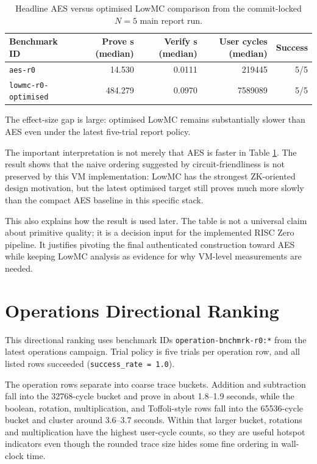 \begin{table}[H]
\centering
\reporttablesetup
\begin{tabular*}{\textwidth}{@{\extracolsep{\fill}}lrrrr@{}}
\hline
Benchmark ID & Prove s (median) & Verify s (median) & User cycles (median) & Success \\
\hline
\texttt{aes-r0} & 14.530 & 0.0111 & 219445 & 5/5 \\
\texttt{lowmc-r0-optimised} & 484.279 & 0.0970 & 7589089 & 5/5 \\
\hline
\end{tabular*}
\caption{Headline AES versus optimised LowMC comparison from the commit-locked
\(N=5\) main report run.}
\label{tab:cross-algo-comparison}
\end{table}

The effect-size gap is large: optimised LowMC remains substantially slower than
AES even under the latest five-trial report policy.

The important interpretation is not merely that AES is faster in Table
\ref{tab:cross-algo-comparison}. The result shows that the naive ordering
suggested by circuit-friendliness is not preserved by this VM implementation:
LowMC has the strongest ZK-oriented design motivation, but the latest optimised
target still proves much more slowly than the compact AES baseline in this
specific stack.

This also explains how the result is used later. The table is not a universal
claim about primitive quality; it is a decision input for the implemented RISC
Zero pipeline. It justifies pivoting the final authenticated construction toward
AES while keeping LowMC analysis as evidence for why VM-level measurements are
needed.

\section{Operations Directional Ranking}

This directional ranking uses benchmark IDs
\texttt{operation-bnchmrk-r0:*} from the latest operations campaign. Trial
policy is five trials per operation row, and all listed rows succeeded
(\texttt{success\_rate = 1.0}).

The operation rows separate into coarse trace buckets. Addition and subtraction
fall into the 32768-cycle bucket and prove in about 1.8--1.9 seconds, while the
boolean, rotation, multiplication, and Toffoli-style rows fall into the
65536-cycle bucket and cluster around 3.6--3.7 seconds. Within that larger bucket,
rotations and multiplication have the highest user-cycle counts, so they are
useful hotspot indicators even though the rounded trace size hides some fine
ordering in wall-clock time.

